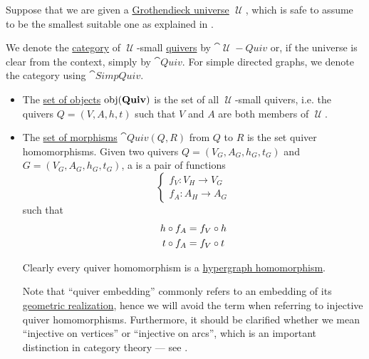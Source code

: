 \begin{definition}\label{def:category_of_small_quivers}
  Suppose that we are given a \hyperref[def:grothendieck_universe]{Grothendieck universe} \( \mscrU \), which is safe to assume to be the smallest suitable one as explained in .

  We denote the \hyperref[def:category]{category} of \( \mscrU \)-small \hyperref[def:hypergraph]{quivers} by \( \cat{\mscrU-Quiv} \) or, if the universe is clear from the context, simply by \( \cat{Quiv} \). For simple directed graphs, we denote the category using \( \cat{SimpQuiv} \).

  \begin{itemize}
    \item The \hyperref[def:category/objects]{set of objects} \( \operatorname{obj}(\operatorname{\mathbf{Quiv}}) \) is the set of all \( \mscrU \)-small quivers, i.e. the quivers \( Q = (V, A, h, t) \) such that \( V \) and \( A \) are both members of \( \mscrU \).

    \item The \hyperref[def:category/morphisms]{set of morphisms} \( \cat{Quiv}(Q, R) \) from \( Q \) to \( R \) is the set quiver homomorphisms. Given two quivers \( Q = (V_G, A_G, h_G, t_G) \) and \( G = (V_G, A_G, h_G, t_G) \), a  is a pair of functions
    \begin{equation}\label{eq:def:category_of_small_quivers/homomorphism}
      \begin{cases}
        f_V: V_H \to V_G \\
        f_A: A_H \to A_G
      \end{cases}
    \end{equation}
    such that
    \begin{align}
      h \mathbin \circ f_A &= f_V \mathbin \circ h \label{eq:def:category_of_small_quivers/homomorphism/head} \\
      t \mathbin \circ f_A &= f_V \mathbin \circ t \label{eq:def:category_of_small_quivers/homomorphism/tail}
    \end{align}

    Clearly every quiver homomorphism is a \hyperref[eq:def:category_of_small_hypergraphs/homomorphism]{hypergraph homomorphism}.

    Note that \enquote{quiver embedding} commonly refers to an embedding of its \hyperref[def:quiver_geometric_realization/undirected]{geometric realization}, hence we will avoid the term when referring to injective quiver homomorphisms. Furthermore, it should be clarified whether we mean \enquote{injective on vertices} or \enquote{injective on arcs}, which is an important distinction in category theory --- see .


\end{itemize}
\end{definition}
